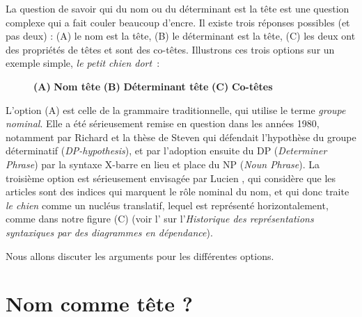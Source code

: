 La question de savoir qui du nom ou du déterminant est la tête est une question complexe qui a fait couler beaucoup d’encre. Il existe trois réponses possibles (et pas deux) : (A) le nom est la tête, (B) le déterminant est la tête, (C) les deux ont des propriétés de têtes et sont des co-têtes. Illustrons ces trois options sur un exemple simple, \textit{le petit chien dort~}:

\begin{figure}

   \textbf{(A)} \textbf{Nom tête}  \textbf{(B)} \textbf{Déterminant tête}  \textbf{(C)} \textbf{Co-têtes}
   \caption{\label{fig:}}
\end{figure}

L’option (A) est celle de la grammaire traditionnelle, qui utilise le terme \textit{groupe nominal}. Elle a été sérieusement remise en question dans les années 1980, notamment par Richard \citet{Hudson1984} et la thèse de Steven \citet{Abney1987} qui défendait l’hypothèse du groupe déterminatif (\textit{DP-hypothesis}), et par l’adoption ensuite du DP (\textit{Determiner Phrase}) par la syntaxe X-barre en lieu et place du NP (\textit{Noun Phrase}). La troisième option est sérieusement envisagée par Lucien \citet{Tesnière1959}, qui considère que les articles sont des indices qui marquent le rôle nominal du nom, et qui donc traite \textit{le chien} comme un nucléus translatif, lequel est représenté horizontalement, comme dans notre figure (C) (voir l’ sur l’\textit{Historique des représentations syntaxiques par des diagrammes en dépendance}).

Nous allons discuter les arguments pour les différentes options.

\section{Nom comme tête ?}\label{sec:3.3.24}

